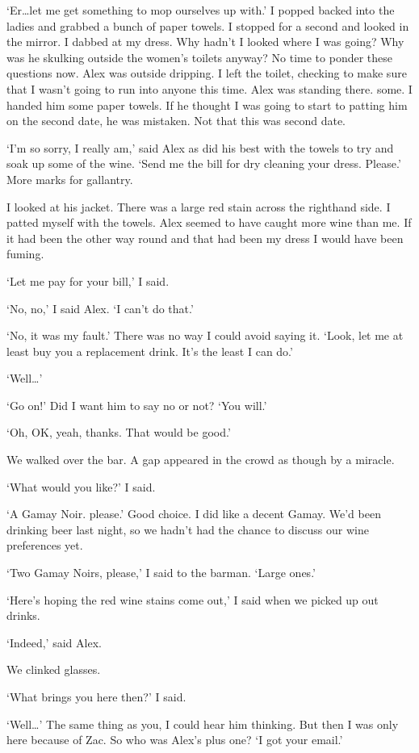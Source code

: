 `Er\dots let me get something to mop ourselves up with.' I popped
backed into the ladies and grabbed a bunch of paper towels. I
stopped for a second and looked in the mirror. I dabbed at my dress.
Why hadn't I looked where I was going? Why was he skulking outside
the women's toilets anyway? No time to ponder these questions now.
Alex was outside dripping. I left the toilet, checking to make sure
that I wasn't going to run into anyone this time. Alex was standing
there. some. I handed him some paper towels. If he thought I was
going to start to patting him on the second date, he was mistaken.
Not that this was second date.

`I'm so sorry, I really am,' said Alex as did his best with the
towels to try and soak up some of the wine. `Send me the bill for
dry cleaning your dress. Please.' More marks for gallantry.

I looked at his jacket. There was a large red stain across the
righthand side. I patted myself with the towels. Alex seemed to have
caught more wine than me. If it had been the other way round and
that had been my dress I would have been fuming.

`Let me pay for your bill,' I said.

`No, no,' I said Alex. `I can't do that.'

`No, it was my fault.' There was no way I could avoid
saying it. `Look, let me at least buy you a replacement drink. It's the least I can do.'

`Well\dots'

`Go on!' Did I want him to say no or not? `You will.'

`Oh, OK, yeah, thanks. That would be good.'

We walked over the bar. A gap appeared in the crowd as though by a
miracle.

`What would you like?' I said.

`A Gamay Noir. please.' Good choice. I did like a decent Gamay. We'd
been drinking beer last night, so we hadn't had the chance to
discuss our wine preferences yet.

`Two Gamay Noirs, please,' I said to the barman. `Large ones.'

`Here's hoping the red wine stains come out,' I said when we picked
up out drinks.

`Indeed,' said Alex.

We clinked glasses.

`What brings you here then?' I said.

`Well\dots' The same thing as you, I could hear him thinking. But then I was only here because of Zac. So who was Alex's plus one? `I got
your email.'

